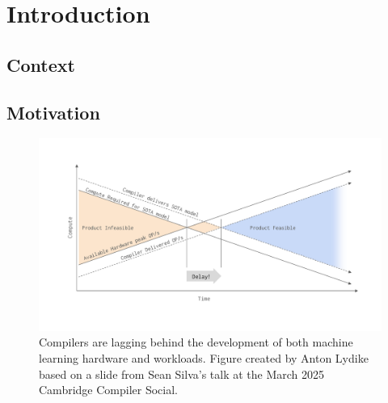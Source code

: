\chapter{Introduction}
\label{chap:introduction}

%
%


\section{Context}
\label{sec:context}

\section{Motivation}
\label{sec:motivation}


\begin{figure}[H]
    \centering
    \includegraphics[width=\textwidth]{images/11_introduction/compilers_lagging.pdf}
    \caption{Compilers are lagging behind the development of both machine learning hardware and workloads. Figure created by Anton Lydike based on a slide from Sean Silva's talk at the March 2025 Cambridge Compiler Social.}
    \label{fig:compilers-lagging}
\end{figure}


